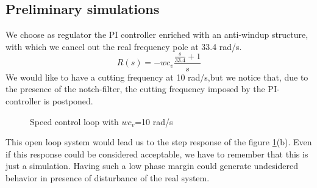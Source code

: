 \subsection{Preliminary simulations}
We choose as regulator the PI controller enriched with an anti-windup structure, with which we cancel out the real frequency pole at 33.4 rad/s.
\[
R(s)=-wc_v
\frac{\frac{s}{33.4}+1}{s}
\]
We would like to have a cutting frequency at 10 rad/s,but we notice that, due to the presence of the notch-filter, the cutting frequency imposed by the PI-controller is postponed. 

\begin{figure}[h]
	\centering
	\quad
	\label{fig:Step_PI_10}
	\caption{Speed control loop with  $wc_{v} $=10 rad/s}
	\label{fig:Bode and Step PI 10}
\end{figure}


This open loop system would lead us to the step response of the figure \ref{fig:Bode and Step PI 10}(b). 
Even if this response could be considered acceptable, we have to remember that this is just a simulation. Having such a low phase margin could generate undesidered behavior in presence of disturbance of the real system.

